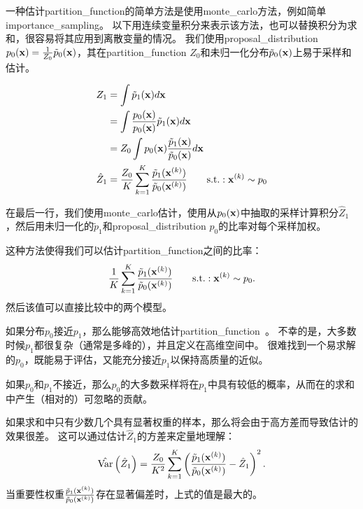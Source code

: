 一种估计\gls{partition_function}的简单方法是使用\gls{monte_carlo}方法，例如简单\gls{importance_sampling}。
以下用连续变量积分来表示该方法，也可以替换积分为求和，很容易将其应用到离散变量的情况。
我们使用\gls{proposal_distribution} $p_0(\mathbf{x}) = \frac{1}{Z_0} \tilde{p}_0( \mathbf{x})$，其在\gls{partition_function} $Z_0$和未归一化分布$\tilde{p}_0(\mathbf{x})$上易于采样和估计。


\begin{align}
	Z_1 &= \int \tilde{p}_1 (\mathbf{x}) d \mathbf{x} \\
	&= \int  \frac{ p_0(\mathbf{x}) }{ p_0(\mathbf{x}) }   \tilde{p}_1 (\mathbf{x}) d \mathbf{x} \\
	&= Z_0 \int  p_0(\mathbf{x})   \frac{ \tilde{p}_1 (\mathbf{x}) }{ \tilde{p}_0 (\mathbf{x}) } d \mathbf{x} \\
	\hat{Z}_1 &= \frac{Z_0}{K} \sum_{k=1}^K \frac{ \tilde{p}_1(\mathbf{x}^{(k)})  }{ \tilde{p}_0(\mathbf{x}^{(k)}) }  \quad\quad \text{s.t.}: \mathbf{x}^{(k)} \sim p_0 \label{eq:18.44}
\end{align}

在最后一行，我们使用\gls{monte_carlo}估计，使用从$p_0(\mathbf{x})$中抽取的采样计算积分$\hat{Z}_1$，然后用未归一化的$\tilde{p}_1$和\gls{proposal_distribution} $p_0$的比率对每个采样加权。


这种方法使得我们可以估计\gls{partition_function}之间的比率：
\begin{equation}
	\frac{1}{K} \sum_{k=1}^K \frac{ \tilde{p}_1 (\mathbf{x}^{(k)}) }{ \tilde{p}_0 (\mathbf{x}^{(k)}) }
	\quad\quad \text{s.t.}: \mathbf{x}^{(k)} \sim p_0.
\end{equation}
然后该值可以直接比较中的两个模型。


如果分布$p_0$接近$p_1$，那么能够高效地估计\gls{partition_function}~\citep{Minka_2005}。
不幸的是，大多数时候$p_1$都很复杂（通常是多峰的），并且定义在高维空间中。
很难找到一个易求解的$p_0$，既能易于评估，又能充分接近$p_1$以保持高质量的近似。


如果$p_0$和$p_1$不接近，那么$p_0$的大多数采样将在$p_1$中具有较低的概率，从而在的求和中产生（相对的）可忽略的贡献。


如果求和中只有少数几个具有显著权重的样本，那么将会由于高方差而导致估计的效果很差。
这可以通过估计$\hat{Z}_1$的方差来定量地理解：
\begin{equation}
	\hat{\text{Var}} \left( \hat{Z}_1 \right)  = \frac{Z_0 }{K^2} \sum_{k=1}^K
\left(  \frac{ \tilde{p}_1(\mathbf{x}^{(k)}) }{  \tilde{p}_0(\mathbf{x}^{(k)}) } - \hat{Z}_1  \right)^2.
\end{equation}
当重要性权重$\frac{ \tilde{p}_1(\mathbf{x}^{(k)}) }{ \tilde{p}_0(\mathbf{x}^{(k)}) } $存在显著偏差时，上式的值是最大的。

